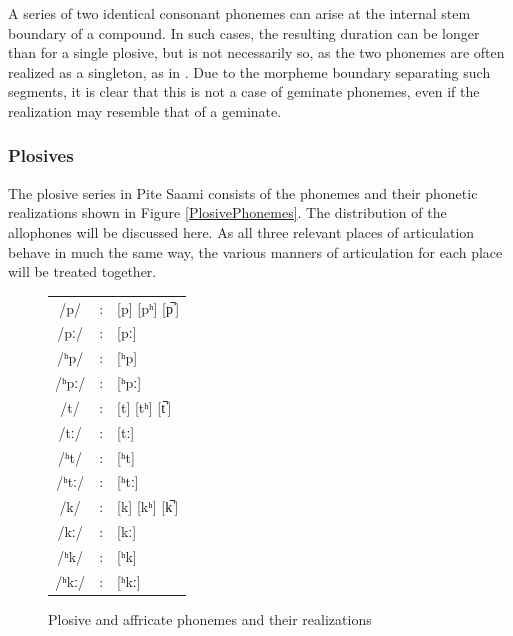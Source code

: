 A series of two identical consonant phonemes can arise at the internal stem boundary of a compound. In such cases, the resulting duration can be longer than for a single plosive, but is not necessarily so, as the two phonemes are often realized as a singleton, as in .
Due to the morpheme boundary separating such segments, it is clear that this is not a case of geminate phonemes, even if the realization may resemble that of a geminate. 


\subsubsection{Plosives}\label{Plosives}%
The plosive series in Pite Saami consists of the phonemes and their phonetic realizations shown in Figure \vref{PlosivePhonemes}. The distribution of the allophones will be discussed here. As all three relevant places of articulation behave in much the same way, the various manners of articulation for each place will be treated together.
\begin{figure}\begin{center}
\begin{tabular}{c c l}
/p/ &:& [p] [pʰ] [p̚\,] \\ %
/pː/ &:& [pː] \\ %
/ʰp/ &:& [ʰp] \\ %
/ʰpː/ &:& [ʰpː] \\ %
/t/ &:& [t] [tʰ] [t̚\,] \\%
/tː/ &:& [tː] \\
/ʰt/ &:& [ʰt] \\
/ʰtː/ &:& [ʰtː] \\
/k/ &:& [k] [kʰ] [k̚\,] \\
/kː/ &:& [kː] \\
/ʰk/ &:& [ʰk] \\
/ʰkː/ &:& [ʰkː] \\
\end{tabular}
\end{center}
\caption{Plosive and affricate phonemes and their realizations}\label{PlosivePhonemes}
\end{figure}


